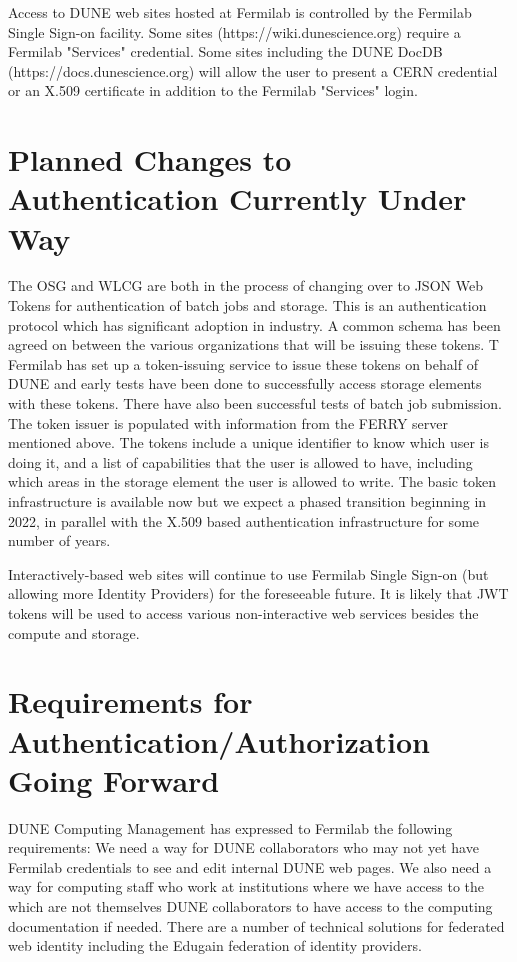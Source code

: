 \documentclass[../main-v1.tex]{subfiles}
\begin{document}
Access to DUNE web sites hosted at Fermilab is controlled by the Fermilab Single Sign-on facility.  Some sites (https://wiki.dunescience.org) require a Fermilab "Services" credential. Some sites including the DUNE DocDB (https://docs.dunescience.org) will allow the user to present a CERN credential  or an X.509 certificate in addition to the Fermilab "Services" login.


\section{Planned Changes to Authentication Currently Under Way}

The OSG and WLCG are both in the process of changing over to JSON Web Tokens for authentication of
batch jobs and storage. This is an authentication protocol which has significant adoption in industry. A common schema has been agreed on between the various organizations that will be issuing these tokens.  T
Fermilab has set up a token-issuing service to issue these tokens on behalf of DUNE and early tests have been 
done to successfully access storage elements with these tokens. There have also been successful tests of batch job submission. The token issuer is populated with information 
from the FERRY server mentioned above. The tokens include a unique identifier to 
know which user is doing it, and a list of capabilities that the user is allowed to have, including which 
areas in the storage element the user is allowed to write.  The basic token infrastructure is available now but we expect a phased transition beginning in 2022, in parallel with the X.509 
based authentication infrastructure for some number of years.

Interactively-based web sites will continue to use Fermilab Single Sign-on (but allowing more Identity Providers)
for the foreseeable future.  It is likely that JWT tokens will be used to access various non-interactive web
services besides the compute and storage. 
 

\section{Requirements for Authentication/Authorization Going Forward}

DUNE Computing Management has expressed to Fermilab the following requirements:
We need a way for DUNE collaborators who may not yet have Fermilab credentials to see and edit internal DUNE 
web pages.  We also need a way for computing staff who work at institutions where we have access to the 
which are not themselves DUNE collaborators to have access to the computing documentation if needed.
There are a number of technical solutions for federated web identity including the Edugain federation
of identity providers.  
\end{document}
